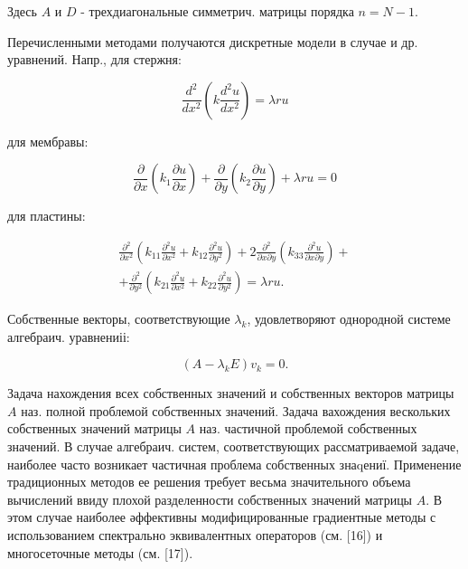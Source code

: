 \documentclass[10pt]{article}
\begin{document}
Здесь $A$ и $D$ - трехдиагональные симметрич. матрицы порядка $n=N-1$.



Перечисленными методами получаются дискретные модели в случае и др. уравнений. Напр., для стержня:



\[

\frac{d^{2}}{d x^{2}}\left(k \frac{d^{2} u}{d x^{2}}\right)=\lambda r u

\]



для мембравы:



\[

\frac{\partial}{\partial x}\left(k_{1} \frac{\partial u}{\partial x}\right)+\frac{\partial}{\partial y}\left(k_{2} \frac{\partial u}{\partial y}\right)+\lambda r u=0

\]



для пластины:



\[

\begin{gathered}

\frac{\partial^{2}}{\partial x^{2}}\left(k_{11} \frac{\partial^{2} u}{\partial x^{2}}+k_{12} \frac{\partial^{2} u}{\partial y^{2}}\right)+2 \frac{\partial^{2}}{\partial x \partial y}\left(k_{33} \frac{\partial^{2} u}{\partial x \partial y}\right)+ \\

+\frac{\partial^{2}}{\partial y^{2}}\left(k_{21} \frac{\partial^{2} u}{\partial x^{2}}+k_{22} \frac{\partial^{2} u}{\partial y^{2}}\right)=\lambda r u .

\end{gathered}

\]



Собственные векторы, соответствующие $\lambda_{k}$, удовлетворяют однородной системе алгебраич. уравнениіі:



\[

\left(A-\lambda_{k} E\right) v_{k}=0 .

\]



Задача нахождения всех собственных значений и собственных векторов матрицы $A$ наз. полной проблемой собственных значений. Задача вахождения вескольких собственных значений матрицы $A$ наз. частичной проблемой собственных значений. В случае алгебраич. систем, соответствующих рассматриваемой задаче, наиболее часто возникает частичная проблема собственных знаqениї. Применение традиционных методов ее решения требует весьма значительного объема вычислений ввиду плохой разделенности собственных значений матрицы $A$. В этом случае наиболее әффективны модифицированные градиентные методы с использованием спектрально эквивалентных операторов (см. [16]) и многосеточные методы (см. [17]).
\end{document}
